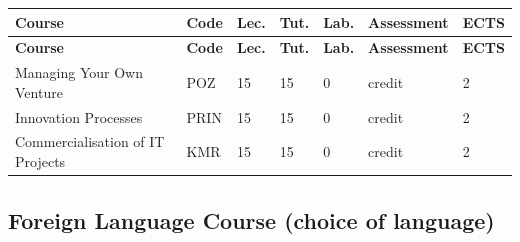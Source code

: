 \documentclass[12pt,a4paper]{article}
\newcommand{\thdrule}{\noalign{\global\setlength{\extrarowheight}{0pt}}}
\newcommand{\thdend}{\noalign{\global\setlength{\extrarowheight}{4pt}}}
\begin{document}
{\scriptsize
\begin{longtable}{m{5.5cm}m{0.8cm}m{1cm}m{1cm}m{1cm}m{1.7cm}m{0.7cm}}
\thdrule\toprule
\rowcolor{pjatkRed}
{\color{white}\footnotesize\textbf{\vphantom{Ag}Course}} & {\color{white}\footnotesize\textbf{\vphantom{Ag}Code}} & {\color{white}\footnotesize\textbf{\vphantom{Ag}Lec.}} & {\color{white}\footnotesize\textbf{\vphantom{Ag}Tut.}} & {\color{white}\footnotesize\textbf{\vphantom{Ag}Lab.}} & {\color{white}\footnotesize\textbf{\vphantom{Ag}Assessment}} & {\color{white}\footnotesize\textbf{\vphantom{Ag}ECTS}} \\
\midrule\thdend
\endfirsthead
\thdrule\toprule
\rowcolor{pjatkRed}
{\color{white}\footnotesize\textbf{\vphantom{Ag}Course}} & {\color{white}\footnotesize\textbf{\vphantom{Ag}Code}} & {\color{white}\footnotesize\textbf{\vphantom{Ag}Lec.}} & {\color{white}\footnotesize\textbf{\vphantom{Ag}Tut.}} & {\color{white}\footnotesize\textbf{\vphantom{Ag}Lab.}} & {\color{white}\footnotesize\textbf{\vphantom{Ag}Assessment}} & {\color{white}\footnotesize\textbf{\vphantom{Ag}ECTS}} \\
\midrule\thdend
\endhead
\rowcolor{tableRowLight} Managing Your Own Venture & POZ & 15 & 15 & 0 & {\scriptsize credit} & 2 \\
\rowcolor{tableRowAlt} Innovation Processes & PRIN & 15 & 15 & 0 & {\scriptsize credit} & 2 \\
\rowcolor{tableRowLight} Commercialisation of IT Projects & KMR & 15 & 15 & 0 & {\scriptsize credit} & 2 \\
\bottomrule
\end{longtable}}

\subsection*{Foreign Language Course (choice of language)}
\end{document}
